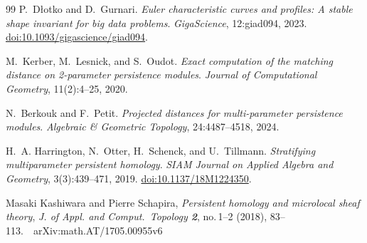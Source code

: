\documentclass[11pt]{article}
\theoremstyle{definition}
\theoremstyle{remark}
\begin{document}
\begin{thebibliography}{99}
P.~D\l{}otko and D.~Gurnari.
\newblock \emph{Euler characteristic curves and profiles: A stable shape invariant for big data problems}.
\newblock \emph{GigaScience}, 12:giad094, 2023.
\newblock \href{https://doi.org/10.1093/gigascience/giad094}{doi:10.1093/gigascience/giad094}.

M.~Kerber, M.~Lesnick, and S.~Oudot.
\newblock \emph{Exact computation of the matching distance on 2-parameter persistence modules}.
\newblock \emph{Journal of Computational Geometry}, 11(2):4--25, 2020.

N.~Berkouk and F.~Petit.
\newblock \emph{Projected distances for multi-parameter persistence modules}.
\newblock \emph{Algebraic \& Geometric Topology}, 24:4487--4518, 2024.

H.~A. Harrington, N.~Otter, H.~Schenck, and U.~Tillmann.
\newblock \emph{Stratifying multiparameter persistent homology}.
\newblock \emph{SIAM Journal on Applied Algebra and Geometry}, 3(3):439--471, 2019.
\newblock \href{https://doi.org/10.1137/18M1224350}{doi:10.1137/18M1224350}.

Masaki Kashiwara and Pierre Schapira, 
\newblock \emph{Persistent homology and microlocal sheaf theory}, 
\newblock \emph{J. of Appl. and Comput.\ Topology \textbf{2}}, no.\,1--2 (2018), 83--113.\ \
\newblock \textsf{arXiv:math.AT/1705.00955v6}

\end{thebibliography}
\end{document}
